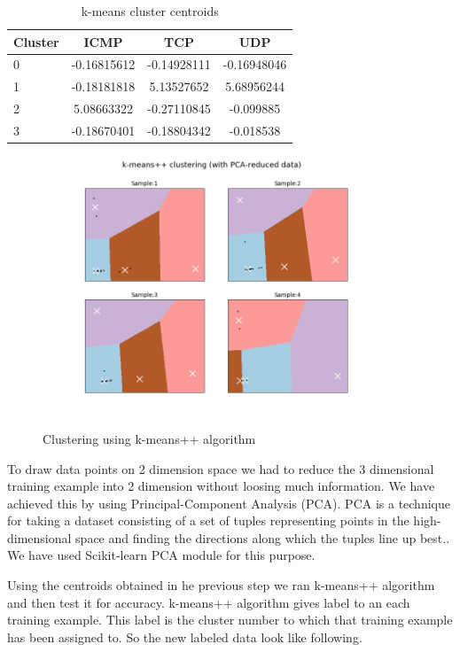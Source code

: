 \documentclass[10pt,oneside,a4paper]{article}
\begin{document}
\begin{table}[H]
\centering
  \begin{tabular}{ l | c  c  c }
    Cluster      & ICMP  & TCP  & UDP \\
    \hline
    0         &{-0.16815612}       &{-0.14928111}    &{-0.16948046} \\
    1         &{-0.18181818}       &{5.13527652}     &{5.68956244} \\
    2         &{5.08663322}        &{-0.27110845}    &{-0.099885} \\
    3         &{-0.18670401}       &{-0.18804342}    &{-0.018538} \\
  \end{tabular}
\caption{k-means cluster centroids} \label{table:centroids}
\end{table}

\begin{figure}[H]
\centering
\includegraphics[width=0.90\textwidth]{kemans-clustering.png}
\caption{Clustering using k-means++ algorithm} \label{fig:k-means-clustering}
\end{figure}

To draw data points on 2 dimension space we had to reduce the 3 dimensional training example into 2 dimension without loosing much information. We have achieved this by using Principal-Component Analysis (PCA). PCA is a technique for taking a dataset consisting of a set of tuples representing points in the high-dimensional space and finding the directions along which the tuples line up best.\cite{pca}. We have used Scikit-learn PCA module for this purpose.

Using the centroids obtained in he previous step we ran k-means++ algorithm and then test it for accuracy. k-means++ algorithm gives label to an each training example. This label is the cluster number to which that training example has been assigned to. So the new labeled data look like following.
\end{document}

